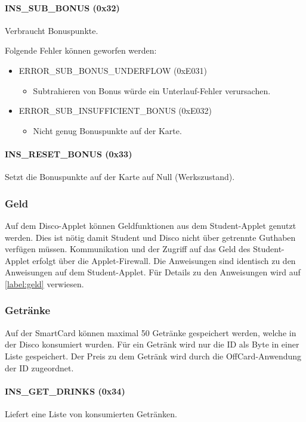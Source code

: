 \paragraph{INS\_SUB\_BONUS (0x32)}
Verbraucht Bonuspunkte.

Folgende Fehler können geworfen werden:
\begin{itemize}
	\item ERROR\_SUB\_BONUS\_UNDERFLOW (0xE031)
	\begin{itemize}
		\item Subtrahieren von Bonus würde ein Unterlauf-Fehler verursachen.
	\end{itemize}
	\item ERROR\_SUB\_INSUFFICIENT\_BONUS (0xE032)
	\begin{itemize}
		\item Nicht genug Bonuspunkte auf der Karte.
	\end{itemize}
\end{itemize}
\paragraph{INS\_RESET\_BONUS (0x33)}
Setzt die Bonuspunkte auf der Karte auf Null (Werkszustand).

\subsubsection{Geld}
Auf dem Disco-Applet können Geldfunktionen aus dem Student-Applet genutzt werden.
Dies ist nötig damit Student und Disco nicht über getrennte Guthaben verfügen müssen.
Kommunikation und der Zugriff auf das Geld des Student-Applet erfolgt über die Applet-Firewall.
Die Anweisungen sind identisch zu den Anweisungen auf dem Student-Applet.
Für Details zu den Anweisungen wird auf \autoref{label:geld} verwiesen.

\subsubsection{Getränke}
Auf der SmartCard können maximal 50 Getränke gespeichert werden, welche in der Disco konsumiert wurden.
Für ein Getränk wird nur die ID als Byte in einer Liste gespeichert.
Der Preis zu dem Getränk wird durch die OffCard-Anwendung der ID zugeordnet.
	
\paragraph{INS\_GET\_DRINKS (0x34)}
Liefert eine Liste von konsumierten Getränken.
